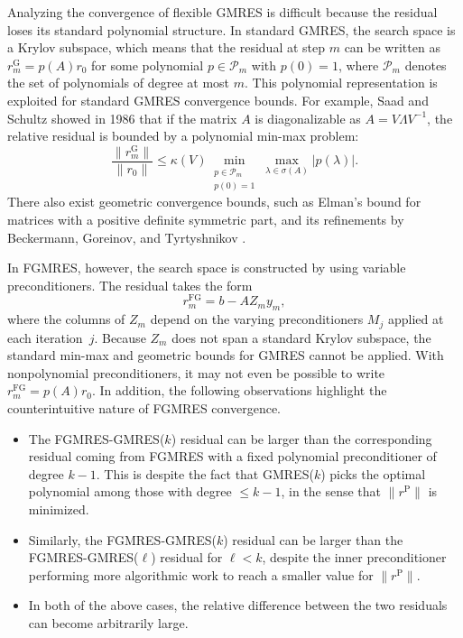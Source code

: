 \documentclass{siamart251216}
\begin{document}
Analyzing the convergence of flexible GMRES is difficult because the residual loses its standard polynomial structure. In standard GMRES, the search space is a Krylov subspace, which means that the residual at step $m$ can be written as $r_m^{\mathrm{G}} = p(A)r_0$ for some polynomial $p \in \mathcal{P}_m$ with $p(0)=1$, where $\mathcal{P}_m$ denotes the set of polynomials of degree at most $m$.
This polynomial representation is exploited for standard GMRES convergence bounds. For example, Saad and Schultz \cite{SaadSchultz1986} showed in 1986 that if the matrix $A$ is diagonalizable as $A = V \Lambda V^{-1}$, the relative residual is bounded by a polynomial min-max problem:
$$ \frac{\|r_m^{\mathrm{G}}\|}{\|r_0\|} \leq \kappa(V) \min_{\substack{p \in \mathcal{P}_m \\ p(0)=1}} \max_{\lambda \in \sigma(A)} |p(\lambda)|. $$
There also exist geometric convergence bounds, such as Elman's bound \cite{Elman1982} for matrices with a positive definite symmetric part, and its refinements by Beckermann, Goreinov, and Tyrtyshnikov \cite{beckermann2005some}.

In FGMRES, however, the search space is constructed by using variable preconditioners. The residual takes the form
$$ r_m^{\mathrm{FG}} = b - A Z_m y_m, $$
where the columns of $Z_m$ depend on the varying preconditioners $M_j$ applied at each iteration~$j$. Because $Z_m$ does not span a standard Krylov subspace, the standard min-max and geometric bounds for GMRES cannot be applied. With nonpolynomial preconditioners, it may not even be possible to write $r_m^{\mathrm{FG}} = p(A)r_0$. In addition, the following observations highlight the counterintuitive nature of FGMRES convergence. 
\begin{itemize}
    \item The FGMRES-GMRES($k$) residual can be larger than the corresponding residual coming from FGMRES with a fixed polynomial preconditioner of degree $k-1$. This is despite the fact that GMRES($k$) picks the optimal polynomial among those with degree $\leq k-1$, in the sense that $\| r^{\mathrm{P}} \|$ is minimized.
    \item Similarly, the FGMRES-GMRES($k$) residual can be larger than the FGMRES-GMRES($\ell$) residual for $\ell < k$, despite the inner preconditioner performing more algorithmic work to reach a smaller value for $\| r^{\mathrm{P}} \|$.
    \item In both of the above cases, the relative difference between the two residuals can become arbitrarily large.
\end{itemize}
\smallskip
\end{document}
